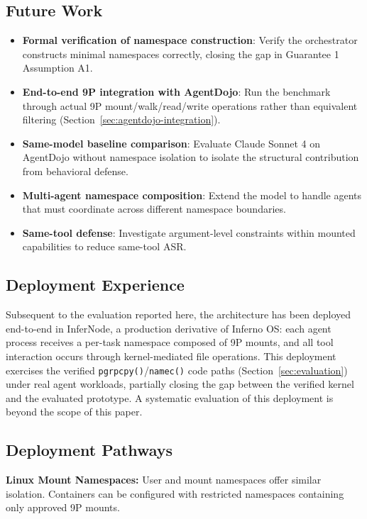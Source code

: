 \documentclass{article}
\begin{document}
\subsection{Future Work}

\begin{itemize}
    \item \textbf{Formal verification of namespace construction}: Verify the orchestrator constructs minimal namespaces correctly, closing the gap in Guarantee 1 Assumption A1.
    \item \textbf{End-to-end 9P integration with AgentDojo}: Run the benchmark through actual 9P mount/walk/read/write operations rather than equivalent filtering (Section~\ref{sec:agentdojo-integration}).
    \item \textbf{Same-model baseline comparison}: Evaluate Claude Sonnet 4 on AgentDojo without namespace isolation to isolate the structural contribution from behavioral defense.
    \item \textbf{Multi-agent namespace composition}: Extend the model to handle agents that must coordinate across different namespace boundaries.
    \item \textbf{Same-tool defense}: Investigate argument-level constraints within mounted capabilities to reduce same-tool ASR.
\end{itemize}

\subsection{Deployment Experience}

Subsequent to the evaluation reported here, the architecture has been deployed end-to-end in InferNode, a production derivative of Inferno OS: each agent process receives a per-task namespace composed of 9P mounts, and all tool interaction occurs through kernel-mediated file operations. This deployment exercises the verified \texttt{pgrpcpy()}/\texttt{namec()} code paths (Section~\ref{sec:evaluation}) under real agent workloads, partially closing the gap between the verified kernel and the evaluated prototype. A systematic evaluation of this deployment is beyond the scope of this paper.

\subsection{Deployment Pathways}

\textbf{Linux Mount Namespaces:} User and mount namespaces offer similar isolation. Containers can be configured with restricted namespaces containing only approved 9P mounts.
\end{document}
